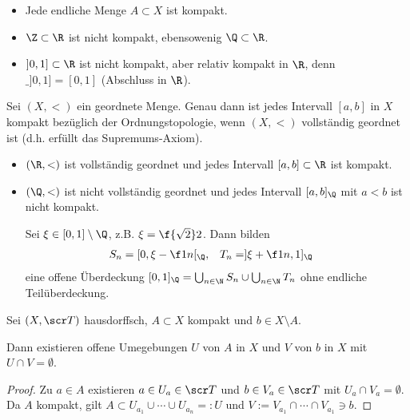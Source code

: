 \begin{ex}
	\begin{itemize}
		\item
			Jede endliche Menge $A \subset X$ ist kompakt.
		\item
			$\Z \subset \R$ ist nicht kompakt, ebensowenig $\Q \subset \R$.
		\item
			$]0,1] \subset \R$ ist nicht kompakt, aber relativ kompakt in $\R$, denn $\_{]0,1]} = [0,1]$ (Abschluss in $\R$).
	\end{itemize}
\end{ex}

\begin{st}
	Sei $(X, <)$ ein geordnete Menge.
	Genau dann ist jedes Intervall $[a,b]$ in $X$ kompakt bezüglich der Ordnungstopologie, wenn $(X, <)$ vollständig geordnet ist (d.h. erfüllt das Supremums-Axiom).
\end{st}

\begin{ex}
	\begin{itemize}
		\item
			$(\R, <)$ ist vollständig geordnet und jedes Intervall $[a,b] \subset \R$ ist kompakt.
		\item
			$(\Q, <)$ ist nicht vollständig geordnet und jedes Intervall $[a,b]_\Q$ mit $a<b$ ist nicht kompakt.

			Sei $\xi \in [0,1] \setminus \Q$, z.B. $\xi = \f{\sqrt 2}2$.
			Dann bilden
			\begin{align*}
				S_n &= [0, \xi - \f 1n[_{\Q},&
				T_n &= ]\xi + \f 1n, 1]_{\Q}
			\end{align*}
			eine offene Überdeckung $[0,1]_{\Q} = \bigcup_{n\in\N} S_n \cup \bigcup_{n\in\N} T_n$ ohne endliche Teilüberdeckung.
	\end{itemize}
\end{ex}

\begin{lem}
	Sei $(X, \scr T)$ hausdorffsch, $A \subset X$ kompakt und $b \in X \setminus A$.

	Dann existieren offene Umegebungen $U$ von $A$ in $X$ und $V$ von $b$ in $X$ mit $U\cap V = \emptyset$.
	\begin{proof}
		Zu $a \in A$ existieren $a \in U_a \in \scr T$ und $b \in V_a \in \scr T$ mit $U_a \cap V_a = \emptyset$.
		Da $A$ kompakt, gilt $A \subset U_{a_1} \cup \dotsb \cup U_{a_n} =: U$ und $V := V_{a_1} \cap \dotsb \cap V_{a_1} \ni b$.
	\end{proof}
\end{lem}


